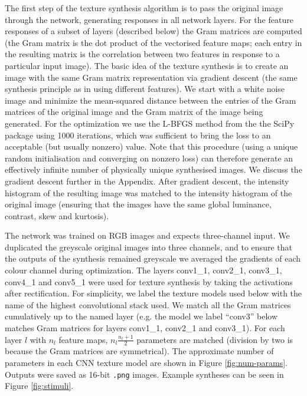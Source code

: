 \documentclass[doc, 11pt,a4paper,natbib]{apa6}\usepackage[]{graphicx}\usepackage[]{color}
\begin{document}
The first step of the texture synthesis algorithm is to pass the original image through the network, generating responses in all network layers.
For the feature responses of a subset of layers (described below) the Gram matrices are computed (the Gram matrix is the dot product of the vectorised feature maps; each entry in the resulting matrix is the correlation between two features in response to a particular input image).
The basic idea of the texture synthesis is to create an image with the same Gram matrix representation via gradient descent (the same synthesis principle as in \citet{portilla_parametric_2000} using different features).
We start with a white noise image and minimize the mean-squared distance between the entries of the Gram matrices of the original image and the Gram matrix of the image being generated.
For the optimization we use the L-BFGS method from the the SciPy package \citep{jones_scipy_2001} using 1000 iterations, which was sufficient to bring the loss to an acceptable (but usually nonzero) value.
Note that this procedure (using a unique random initialisation and converging on nonzero loss) can therefore generate an effectively infinite number of physically unique synthesised images.
We discuss the gradient descent further in the Appendix.
After gradient descent, the intensity histogram of the resulting image was matched to the intensity histogram of the original image (ensuring that the images have the same global luminance, contrast, skew and kurtosis).

The network was trained on RGB images and expects three-channel input.
We duplicated the greyscale original images into three channels, and to ensure that the outputs of the synthesis remained greyscale we averaged the gradients of each colour channel during optimization.
The layers conv1\_1, conv2\_1, conv3\_1, conv4\_1 and conv5\_1 were used for texture synthesis by taking the activations after rectification.
For simplicity, we label the texture models used below with the name of the highest convolutional stack used.
We match all the Gram matrices cumulatively up to the named layer (e.g. the model we label ``conv3'' below matches Gram matrices for layers conv1\_1, conv2\_1 and conv3\_1).
For each layer $l$ with $n_l$ feature maps, $n_l \frac{n_l + 1}{2}$ parameters are matched (division by two is because the Gram matrices are symmetrical).
The approximate number of parameters in each CNN texture model are shown in Figure \ref{fig:num-params}.
Outputs were saved as 16-bit \texttt{.png} images.
Example syntheses can be seen in Figure \ref{fig:stimuli}.
\end{document}
